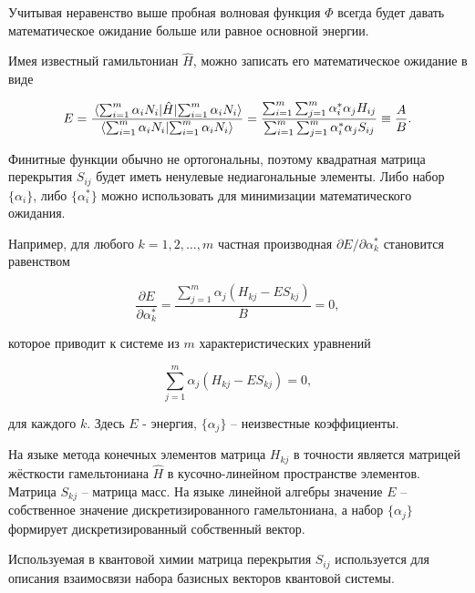 \documentclass{article}
\begin{document}
Учитывая неравенство выше пробная волновая функция $\varPhi$ всегда будет давать математическое ожидание больше или равное основной энергии.

Имея известный гамильтониан $\hat{H}$, можно записать его математическое ожидание в виде

\begin{displaymath}
	E = \frac{\expval{\hat{H}}{\sum_{i=1}^{m} \alpha_{i} N_{i}}}{\bra{\sum_{i=1}^{m} \alpha_{i} N_{i}} \ket{\sum_{i=1}^{m} \alpha_{i} N_{i}} } = 
	\frac{\sum_{i=1}^{m} \sum_{j=1}^{m} \alpha_{i}^{*} \alpha_{j} H_{ij}}{\sum_{i=1}^{m} \sum_{j=1}^{m} \alpha_{i}^{*} \alpha_{j} S_{ij}} \equiv 
	\frac{A}{B}.
\end{displaymath}

Финитные функции обычно не ортогональны, поэтому квадратная матрица перекрытия $S_{ij}$ будет иметь ненулевые недиагональные элементы. 
Либо набор $\{ \alpha_{i} \}$, либо $\{ \alpha_{i}^{*} \}$ можно использовать для минимизации математического ожидания.

Например, для любого $k = 1, 2, \dots, m$ частная производная $\partial E / \partial \alpha_{k}^{*}$ становится равенством

\begin{displaymath}
	\frac{\partial E}{\partial \alpha_{k}^{*}} = \frac{\sum_{j=1}^{m} \alpha_{j} (H_{kj} - E S_{kj})}{B}= 0,
\end{displaymath}

\noindent которое приводит к системе из $m$ характеристических уравнений

\begin{displaymath}
	\sum_{j=1}^{m} \alpha_{j} (H_{kj} - E S_{kj}) = 0,
\end{displaymath}

\noindent для каждого $k$. Здесь $E$ - энергия, $\{ \alpha_{j} \}$ -- неизвестные коэффициенты.

На языке метода конечных элементов матрица $H_{kj}$ в точности является матрицей жёсткости гамельтониана $\hat{H}$ в кусочно-линейном пространстве элементов.
Матрица $S_{kj}$ -- матрица масс. На языке линейной алгебры значение $E$ -- собственное значение дискретизированного гамельтониана, а набор $\{ \alpha_{j} \}$  формирует дискретизированный собственный вектор.

\begin{info} %
	Используемая в квантовой химии матрица перекрытия $S_{ij}$ используется для описания взаимосвязи набора базисных векторов квантовой системы.
\end{info}
\end{document}
